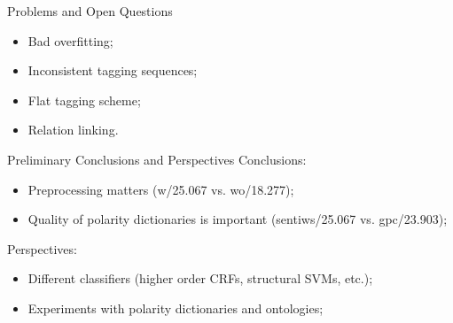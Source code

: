 \documentclass{beamer}
\begin{document}
\begin{frame}{Problems and Open Questions}
  \begin{itemize}
  \item Bad overfitting;
  \item Inconsistent tagging sequences;
  \item Flat tagging scheme;
  \item Relation linking.
  \end{itemize}
\end{frame}

\begin{frame}{Preliminary Conclusions and Perspectives}
  Conclusions:
  \begin{itemize}
  \item Preprocessing matters (w/25.067 vs. wo/18.277);
  \item Quality of polarity dictionaries is important (sentiws/25.067 vs. gpc/23.903);
  \end{itemize}

  Perspectives:
  \begin{itemize}
  \item Different classifiers (higher order CRFs, structural SVMs, etc.);
  \item Experiments with polarity dictionaries and ontologies;
  \end{itemize}
\end{frame}
\end{document}
